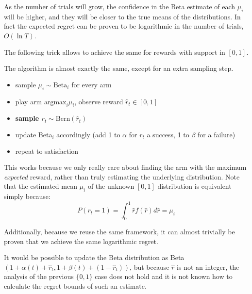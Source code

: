 \documentclass[a4paper]{article}
\begin{document}
As the number of trials will grow, the confidence in the Beta estimate of each $\mu_i$ will be higher, and they will be closer to the true means of the distributions. In fact the expected regret can be proven to be logarithmic in the number of trials, $O(\ln T)$.

$\;$\\

The following trick allows to achieve the same for rewards with support in $[0,1]$.

The algorithm is almost exactly the same, except for an extra sampling step.
\begin{itemize}
\item sample $\mu_i\sim \mbox{Beta}_i$ for every arm
\item play arm $\mbox{argmax}_i \mu_i$, observe reward $\hat{r}_t\in[0,1]$
\item \textbf{sample $r_t\sim\mbox{Bern}(\hat{r}_t)$}
\item update Beta$_i$ accordingly (add 1 to $\alpha$ for $r_t$ a success, 1 to $\beta$ for a failure)
\item repeat to satisfaction
\end{itemize}

This works because we only really care about finding the arm with the maximum \emph{expected} reward, rather than truly estimating the underlying distribution. Note that the estimated mean $\mu_i$ of the unknown $[0,1]$ distribution is equivalent simply because:
$$P(r_t=1)=\int_0^1\hat{r}f(\hat{r})d\hat{r}=\mu_i$$

Additionally, because we reuse the same framework, it can almost trivially be proven that we achieve the same logarithmic regret.

It would be possible to update the Beta distribution as Beta$(1+\alpha(t)+\hat{r}_t, 1+\beta(t)+(1-\hat{r}_t))$, but because $\hat{r}$ is not an integer, the analysis of the previous $\{0,1\}$ case does not hold and it is not known how to calculate the regret bounds of such an estimate.
\end{document}
